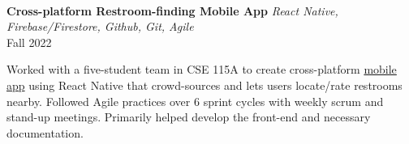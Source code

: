 \documentclass[letterpaper,10pt]{article}
\begin{document}
\begin{multicols*}{2}
  \vspace{.5em} \\
  {
    \fontsize{11pt}{\baselineskip}\selectfont
    \textbf{Cross-platform Restroom-finding Mobile App}
  }
  \textit{React Native, Firebase/Firestore, Github, Git, Agile} \\
  Fall 2022
  \vspace{5px} \\
  \begin{minipage}{.5\textwidth}
    \begin{flushleft}
      Worked with a five-student team in CSE 115A to create cross-platform \href{https://github.com/CSE115AWinter2022-WePee}{mobile app} using React Native that crowd-sources and lets users locate/rate restrooms nearby. Followed Agile practices over 6 sprint cycles with weekly scrum and stand-up meetings. Primarily helped develop the front-end and necessary documentation.
    \end{flushleft}
  \end{minipage}
\end{multicols*}
\end{document}
